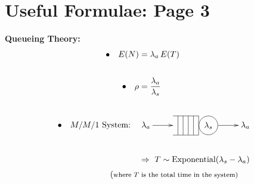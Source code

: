 \documentclass[12pt]{article}
\begin{document}
\newpage

\section*{Useful Formulae: Page 3\\[0.3cm]}
{\bf Queueing Theory:}\\[-0.8cm]
\begin{align*}
\bullet\quad E(N) &= \lambda_a\,E(T)\\[0.6cm]
\bullet\quad \rho &= \frac{\lambda_a}{\lambda_s}\\[0.6cm]
\xymatrixcolsep{0.5cm}
\bullet\quad M/M/1 \text{ System:} \quad & \xymatrix{\lambda_a \ar@{->}[r] & \hspace{-0.1cm}
{\begin{tabular}{@{}c|@{}c|@{}c|@{}c|@{}c|@{}c}
\cline{1-5}
&&&& &
\begin{tikzpicture}[baseline=(char.base)]
\node(char)[draw,shape=circle]{$\lambda_s$};
\end{tikzpicture}\\
\cline{1-5}
\end{tabular}} \hspace{-0.3cm}\ar@{->}[r] &  \lambda_a} \\[0.6cm]
&\Rightarrow \,\, T \sim \text{Exponential}(\lambda_s-\lambda_a)\\[0.1cm]
{\footnotesize(\text{where $T$}} & {\footnotesize\text{ is the total time in the system)}}\\
\end{align*}
\end{document}
